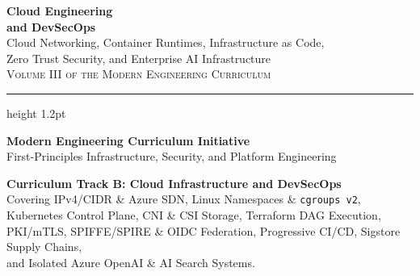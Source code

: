 \documentclass[11pt,oneside]{book}
\begin{document}
\frontmatter

\begin{titlepage}
\begin{center}
  \vspace*{2.0cm}
  {\Huge\sffamily\bfseries\color{headingblue} Cloud Engineering\\and DevSecOps}\\[14pt]
  {\Large\sffamily\color{gray} Cloud Networking, Container Runtimes, Infrastructure as Code,\\Zero Trust Security, and Enterprise AI Infrastructure}\\[24pt]
  {\normalsize\sffamily\scshape Volume III of the Modern Engineering Curriculum}\\[30pt]
  \hrule height 1.2pt
  \vspace*{30pt}

  {\large\sffamily\bfseries Modern Engineering Curriculum Initiative}\\[10pt]
  {\small\sffamily First-Principles Infrastructure, Security, and Platform Engineering}

  \vfill

  \begin{tcolorbox}[
    enhanced,
    colback=white,
    colframe=gray!30!white,
    boxrule=0.8pt,
    arc=2pt,
    left=15pt,right=15pt,top=12pt,bottom=12pt
  ]
  \sffamily\footnotesize\centering
  \textbf{Curriculum Track B: Cloud Infrastructure and DevSecOps}\\
  Covering IPv4/CIDR \& Azure SDN, Linux Namespaces \& \texttt{cgroups v2},\\
  Kubernetes Control Plane, CNI \& CSI Storage, Terraform DAG Execution,\\
  PKI/mTLS, SPIFFE/SPIRE \& OIDC Federation, Progressive CI/CD, Sigstore Supply Chains,\\
  and Isolated Azure OpenAI \& AI Search Systems.
  \end{tcolorbox}

  \vspace*{1.5cm}
\end{center}
\end{titlepage}
\end{document}
